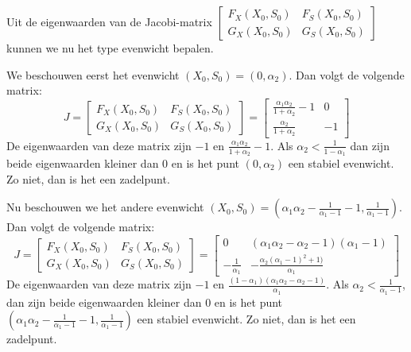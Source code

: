 Uit de eigenwaarden van de Jacobi-matrix $\left[ \begin{array}{cc}
F_X(X_0,S_0) & F_S(X_0,S_0) \\
G_X(X_0,S_0) & G_S(X_0,S_0) \end{array} \right]$ kunnen we nu het type evenwicht bepalen.

We beschouwen eerst het evenwicht $(X_0, S_0) = (0, \alpha_2)$. Dan volgt de volgende matrix:
\[J = \left[ \begin{array}{cc}
F_X(X_0,S_0) & F_S(X_0,S_0) \\
G_X(X_0,S_0) & G_S(X_0,S_0) \end{array} \right] =
\left[ \begin{array}{cc}
\frac{\alpha_1\alpha_2}{1+\alpha_2}-1 & 0 \\
\frac{\alpha_2}{1+\alpha_2} & -1 \end{array} \right]\]
De eigenwaarden van deze matrix zijn $-1$ en $\frac{\alpha_1\alpha_2}{1+\alpha_2}-1$. Als $\alpha_2 < \frac{1}{1-\alpha_1}$ dan zijn beide eigenwaarden kleiner dan 0 en is het punt $(0, \alpha_2)$ een stabiel evenwicht. Zo niet, dan is het een zadelpunt.

Nu beschouwen we het andere evenwicht $(X_0, S_0) = (\alpha_1\alpha_2-\frac{1}{\alpha_1-1}-1,\frac{1}{\alpha_1-1})$. Dan volgt de volgende matrix:
\[J = \left[ \begin{array}{cc}
F_X(X_0,S_0) & F_S(X_0,S_0) \\
G_X(X_0,S_0) & G_S(X_0,S_0) \end{array} \right] =
\left[ \begin{array}{cc}
0 & (\alpha_1\alpha_2-\alpha_2-1)(\alpha_1-1) \\
-\frac{1}{\alpha_1} & -\frac{\alpha_2(\alpha_1-1)^2+1)}{\alpha_1} \end{array} \right]
\]
De eigenwaarden van deze matrix zijn $-1$ en $\frac{(1-\alpha_1)(\alpha_1\alpha_2-\alpha_2-1)}{\alpha_1}$. Als $\alpha_2<\frac{1}{\alpha_1-1}$, dan zijn beide eigenwaarden kleiner dan 0 en is het punt $(\alpha_1\alpha_2-\frac{1}{\alpha_1-1}-1,\frac{1}{\alpha_1-1})$ een stabiel evenwicht. Zo niet, dan is het een zadelpunt.